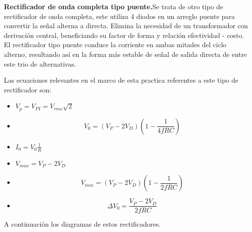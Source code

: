 \documentclass[12pt]{article}
\begin{document}
            \textbf{Rectificador de onda completa tipo puente.}Se trata de otro tipo de rectificador de onda completa, este utiliza 4 diodos en un arreglo 
            puente  para convertir la señal alterna a directa. Elimina la necesidad de un transformador
             con derivación central, beneficiando su factor de forma y relación efectividad - costo. El
             rectificador tipo puente conduce la corriente en ambas mitades del ciclo alterno, resultando así
             en la forma más estable de señal de salida directa de entre este trio de alternativas.\par
             Las ecuaciones relevantes en el marco de esta practica referentes a este tipo de rectificador son:\par
             \begin{multicols}{2}
                \begin{itemize}
                    \item$V_p = V_{PI} = V_{rms}\sqrt{2}$
                    \item \begin{equation*}
                        V_0=(V_P-2V_D)(1-\frac{1}{4fRC})
                    \end{equation*}
                    \item $I_0 = V_0 \frac{1}{R}$
                    \item $V_{max} = V_P - 2V_D$
                    \item \begin{equation*}
                        V_{min}=(V_P-2V_D)(1-\frac{1}{2fRC})
                    \end{equation*}
                    \item \begin{equation*}
                        \Delta  V_0 = \frac{V_P-2V_D}{2fRC}
                    \end{equation*}
                \end{itemize}
            \end{multicols}

        A continuación los diagramas de estos rectificadores.\newpage %
        
\end{document}

